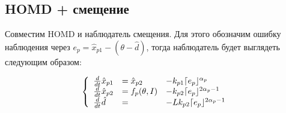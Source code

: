 \documentclass{article}
\DeclarePairedDelimiter{\homd}{\lceil}{\rfloor}
\begin{document}
\subsection{HOMD + смещение}

Совместим HOMD и наблюдатель смещения. Для этого обозначим ошибку наблюдения через $e_p = \hat{x}_{p 1} - (\theta-\hat{d})$, тогда наблюдатель будет выглядеть следующим образом:

$$
\left\{
\begin{array}{lll}
		\frac{d}{dt}\hat{x}_{p 1} &= \hat{x}_{p 2} &- k_{p 1}\homd{e_p}^{\alpha_p} \\
		\frac{d}{dt}\hat{x}_{p 2} &= f_p(\theta,I) &- k_{p 2}\homd{e_p}^{2\alpha_p-1} \\
        \frac{d}{dt}\hat{d} & =                    &-L k_{p 2}\homd{e_p}^{2\alpha_p-1} 
\end{array}
\right.
$$
\end{document}
